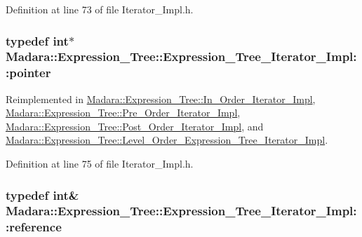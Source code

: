 Definition at line 73 of file Iterator\_\-Impl.h.

\hypertarget{classMadara_1_1Expression__Tree_1_1Expression__Tree__Iterator__Impl_a33e128179eed32fd363d0f426ed313a1}{
\subsubsection[{pointer}]{\setlength{\rightskip}{0pt plus 5cm}typedef int$\ast$ {\bf Madara::Expression\_\-Tree::Expression\_\-Tree\_\-Iterator\_\-Impl::pointer}}}
\label{d0/dd7/classMadara_1_1Expression__Tree_1_1Expression__Tree__Iterator__Impl_a33e128179eed32fd363d0f426ed313a1}


Reimplemented in \hyperlink{classMadara_1_1Expression__Tree_1_1In__Order__Iterator__Impl_aeac02259f4a3938766e11da2eeaf4d5b}{Madara::Expression\_\-Tree::In\_\-Order\_\-Iterator\_\-Impl}, \hyperlink{classMadara_1_1Expression__Tree_1_1Pre__Order__Iterator__Impl_a0ac33eb70ba2854c0d3bf92401860fd8}{Madara::Expression\_\-Tree::Pre\_\-Order\_\-Iterator\_\-Impl}, \hyperlink{classMadara_1_1Expression__Tree_1_1Post__Order__Iterator__Impl_a25a4fb605bf76c81f92b78de5fe9b5b3}{Madara::Expression\_\-Tree::Post\_\-Order\_\-Iterator\_\-Impl}, and \hyperlink{classMadara_1_1Expression__Tree_1_1Level__Order__Expression__Tree__Iterator__Impl_ae3a0bea55dc4f3654e6c2e1d79705ecb}{Madara::Expression\_\-Tree::Level\_\-Order\_\-Expression\_\-Tree\_\-Iterator\_\-Impl}.



Definition at line 75 of file Iterator\_\-Impl.h.

\hypertarget{classMadara_1_1Expression__Tree_1_1Expression__Tree__Iterator__Impl_adbfbf382a07c981d136ea739c913aeab}{
\subsubsection[{reference}]{\setlength{\rightskip}{0pt plus 5cm}typedef int\& {\bf Madara::Expression\_\-Tree::Expression\_\-Tree\_\-Iterator\_\-Impl::reference}}}
\label{d0/dd7/classMadara_1_1Expression__Tree_1_1Expression__Tree__Iterator__Impl_adbfbf382a07c981d136ea739c913aeab}


